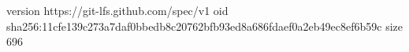 version https://git-lfs.github.com/spec/v1
oid sha256:11cfe139c273a7daf0bbedb8c20762bfb93ed8a686fdaef0a2eb49ec8ef6b59c
size 696

